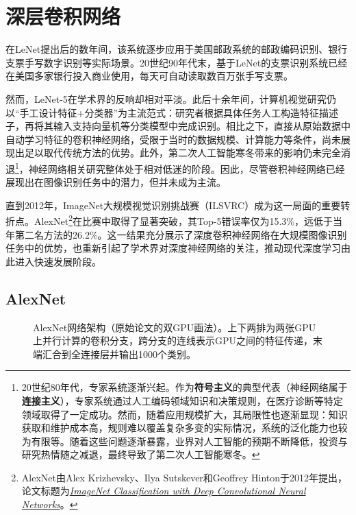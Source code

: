 
\chapter{深层卷积网络}

在LeNet提出后的数年间，该系统逐步应用于美国邮政系统的邮政编码识别、银行支票手写数字识别等实际场景。20世纪90年代末，基于LeNet的支票识别系统已经在美国多家银行投入商业使用，每天可自动读取数百万张手写支票。

然而，LeNet-5在学术界的反响却相对平淡。此后十余年间，计算机视觉研究仍以“手工设计特征+分类器”为主流范式：研究者根据具体任务人工构造特征描述子，再将其输入支持向量机等分类模型中完成识别。相比之下，直接从原始数据中自动学习特征的卷积神经网络，受限于当时的数据规模、计算能力等条件，尚未展现出足以取代传统方法的优势。此外，第二次人工智能寒冬带来的影响仍未完全消退\footnote{20世纪80年代，专家系统逐渐兴起。作为\textbf{符号主义}的典型代表（神经网络属于\textbf{连接主义}），专家系统通过人工编码领域知识和决策规则，在医疗诊断等特定领域取得了一定成功。然而，随着应用规模扩大，其局限性也逐渐显现：知识获取和维护成本高，规则难以覆盖复杂多变的实际情况，系统的泛化能力也较为有限等。随着这些问题逐渐暴露，业界对人工智能的预期不断降低，投资与研究热情随之减退，最终导致了第二次人工智能寒冬。}，神经网络相关研究整体处于相对低迷的阶段。因此，尽管卷积神经网络已经展现出在图像识别任务中的潜力，但并未成为主流。

直到2012年，ImageNet大规模视觉识别挑战赛（ILSVRC）成为这一局面的重要转折点。AlexNet\footnote{AlexNet由Alex Krizhevsky、Ilya Sutskever和Geoffrey Hinton于2012年提出，论文标题为\href{https://proceedings.neurips.cc/paper_files/paper/2012/file/c399862d3b9d6b76c8436e924a68c45b-Paper.pdf}{\textit{ImageNet Classification with Deep Convolutional Neural Networks}}。}在比赛中取得了显著突破，其Top-5错误率仅为15.3\%，远低于当年第二名方法的26.2\%。这一结果充分展示了深度卷积神经网络在大规模图像识别任务中的优势，也重新引起了学术界对深度神经网络的关注，推动现代深度学习由此进入快速发展阶段。

\section{AlexNet}

\begin{figure}[H]
    \caption{AlexNet网络架构（原始论文的双GPU画法）。上下两排为两张GPU上并行计算的卷积分支，跨分支的连线表示GPU之间的特征传递，末端汇合到全连接层并输出1000个类别。}
    \label{fig:alexnet}
\end{figure}

